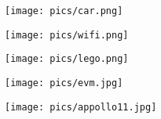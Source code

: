 \documentclass{beamer}
\begin{document}
\begin{frame}{}

\begin{figure}
\texttt{[image: pics/car.png]}
\end{figure}

\end{frame}

\begin{frame}{}

\begin{figure}
\texttt{[image: pics/wifi.png]}
\end{figure}

\end{frame}

\begin{frame}{}

\begin{figure}
\texttt{[image: pics/lego.png]}
\end{figure}

\end{frame}

\begin{frame}{}

\begin{figure}
\texttt{[image: pics/evm.jpg]}
\end{figure}

\end{frame}

\begin{frame}{}

\begin{figure}
\texttt{[image: pics/appollo11.jpg]}
\end{figure}

\end{frame}
\end{document}
